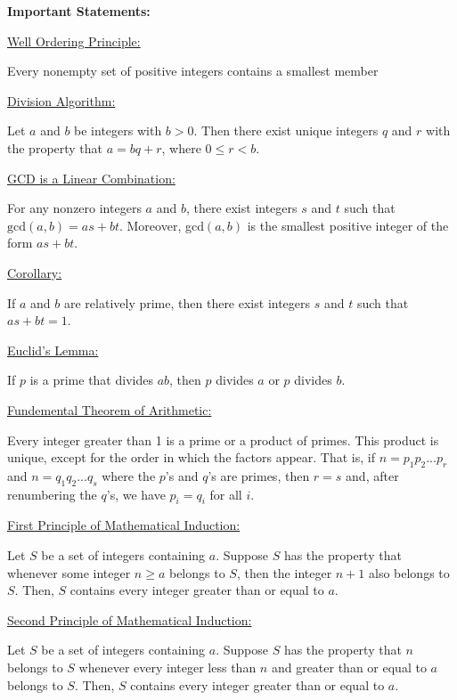 \documentclass[11pt,largemargins]{homework}
\begin{document}
\maketitle

\textbf{\large{Important Statements:}}

\underline{Well Ordering Principle:}

\quad Every nonempty set of positive integers contains a smallest member

\underline{Division Algorithm:} 

\quad Let $a$ and $b$ be integers with $b>0$. Then there exist unique integers $q$ and $r$ with the 
property that $a=bq+r$, where $0\leq r<b$.

\underline{GCD is a Linear Combination:}

\quad For any nonzero integers $a$ and $b$, there exist integers $s$ and $t$ such that $\text{gcd}(a,b)=as+bt$.
Moreover, gcd$(a,b)$ is the smallest positive integer of the form $as+bt$.

\underline{Corollary:}

\quad If $a$ and $b$ are relatively prime, then there exist integers $s$ and $t$ such that $as+bt=1$.

\underline{Euclid's Lemma:}

\quad If $p$ is a prime that divides $ab$, then $p$ divides $a$ or $p$ divides $b$.

\underline{Fundemental Theorem of Arithmetic:}

\quad Every integer greater than 1 is a prime or a product of primes. This product is unique, except for the order 
in which the factors appear. That is, if $n=p_1p_2...p_r$ and $n=q_1q_2...q_s$ where the $p$'s and $q$'s are primes,
then $r=s$ and, after renumbering the $q$'s, we have $p_i = q_i$ for all $i$.

\underline{First Principle of Mathematical Induction:}

\quad Let $S$ be a set of integers containing $a$. Suppose $S$ has the property that whenever some integer 
$n\geq a$ belongs to $S$, then the integer $n+1$ also belongs to $S$. Then, $S$ contains every integer 
greater than or equal to $a$.

\underline{Second Principle of Mathematical Induction:}

\quad Let $S$ be a set of integers containing $a$. Suppose $S$ has the property that $n$ belongs to $S$ whenever 
every integer less than $n$ and greater than or equal to $a$ belongs to $S$. Then, $S$ contains every integer greater 
than or equal to $a$.
\end{document}
